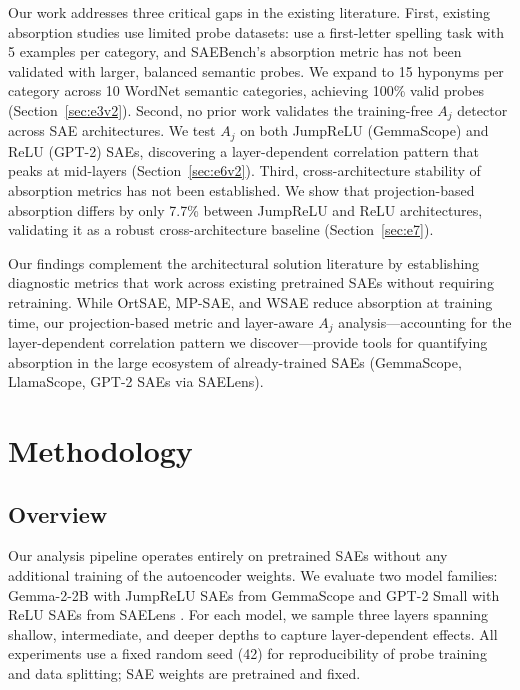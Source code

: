 \documentclass{article}
\begin{document}
Our work addresses three critical gaps in the existing literature. First, existing absorption studies use limited probe datasets: \citet{chanin2024feature} use a first-letter spelling task with 5 examples per category, and SAEBench's absorption metric has not been validated with larger, balanced semantic probes. We expand to 15 hyponyms per category across 10 WordNet semantic categories, achieving 100\% valid probes (Section~\ref{sec:e3v2}). Second, no prior work validates the training-free $A_j$ detector across SAE architectures. We test $A_j$ on both JumpReLU (GemmaScope) and ReLU (GPT-2) SAEs, discovering a layer-dependent correlation pattern that peaks at mid-layers (Section~\ref{sec:e6v2}). Third, cross-architecture stability of absorption metrics has not been established. We show that projection-based absorption differs by only 7.7\% between JumpReLU and ReLU architectures, validating it as a robust cross-architecture baseline (Section~\ref{sec:e7}).

Our findings complement the architectural solution literature by establishing diagnostic metrics that work across existing pretrained SAEs without requiring retraining. While OrtSAE, MP-SAE, and WSAE reduce absorption at training time, our projection-based metric and layer-aware $A_j$ analysis---accounting for the layer-dependent correlation pattern we discover---provide tools for quantifying absorption in the large ecosystem of already-trained SAEs (GemmaScope, LlamaScope, GPT-2 SAEs via SAELens).

\section{Methodology}
\label{sec:method}

\subsection{Overview}

Our analysis pipeline operates entirely on pretrained SAEs without any additional training of the autoencoder weights. We evaluate two model families: Gemma-2-2B with JumpReLU SAEs from GemmaScope \citep{lieberum2024gemmascope} and GPT-2 Small with ReLU SAEs from SAELens \citep{bloom2024saelens}. For each model, we sample three layers spanning shallow, intermediate, and deeper depths to capture layer-dependent effects. All experiments use a fixed random seed (42) for reproducibility of probe training and data splitting; SAE weights are pretrained and fixed.
\end{document}
